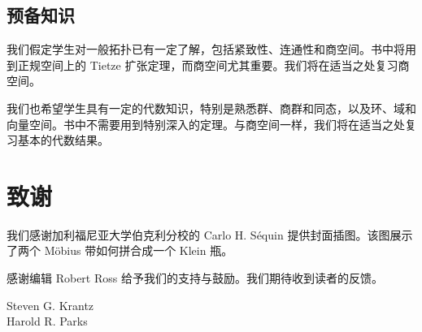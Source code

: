 \section*{预备知识}
我们假定学生对一般拓扑已有一定了解，包括紧致性、连通性和商空间。书中将用到正规空间上的 Tietze 扩张定理，而商空间尤其重要。我们将在适当之处复习商空间。

我们也希望学生具有一定的代数知识，特别是熟悉群、商群和同态，以及环、域和向量空间。书中不需要用到特别深入的定理。与商空间一样，我们将在适当之处复习基本的代数结果。

\chapter*{致谢}
我们感谢加利福尼亚大学伯克利分校的 Carlo H. Séquin 提供封面插图。该图展示了两个 Möbius 带如何拼合成一个 Klein 瓶。

感谢编辑 Robert Ross 给予我们的支持与鼓励。我们期待收到读者的反馈。

\begin{flushright}
Steven G. Krantz\\Harold R. Parks
\end{flushright}
